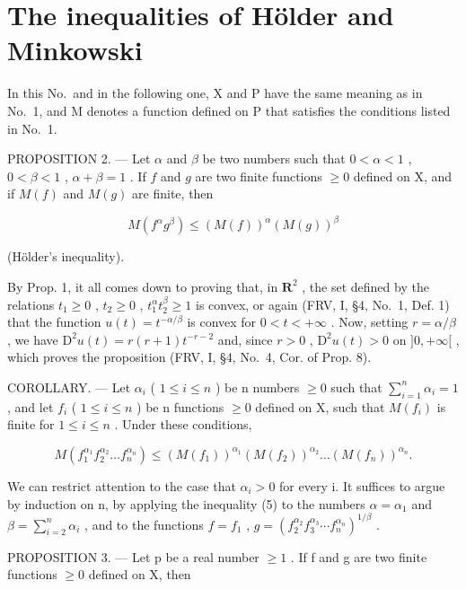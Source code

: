 \section{The inequalities of Hölder and Minkowski}

In this No.~and in the following one, X and P have the same meaning as in No.~1, and M denotes a function defined on P that satisfies the conditions listed in No.~1.

PROPOSITION 2. --- Let \(\alpha\) and \(\beta\) be two numbers such that \(0 < \alpha < 1\) , \(0 < \beta < 1\) , \(\alpha + \beta = 1\) . If \(f\) and \(g\) are two finite functions \(\geqslant 0\) defined on X, and if \(M(f)\) and \(M(g)\) are finite, then

\[
M (f ^ {\alpha} g ^ {\beta}) \leqslant (M (f)) ^ {\alpha} (M (g)) ^ {\beta}\tag{5}
\]

(Hölder's inequality).

By Prop. 1, it all comes down to proving that, in \(\mathbf{R}^2\) , the set defined by the relations \(t_1 \geqslant 0\) , \(t_2 \geqslant 0\) , \(t_1^\alpha t_2^\beta \geqslant 1\) is convex, or again (FRV, I, §4, No.~1, Def. 1) that the function \(u(t) = t^{-\alpha/\beta}\) is convex for \(0 < t < +\infty\) . Now, setting \(r = \alpha/\beta\) , we have \(\mathrm{D}^2 u(t) = r(r + 1)t^{-r - 2}\) and, since \(r > 0\) , \(\mathrm{D}^2 u(t) > 0\) on \(]0, +\infty[\) , which proves the proposition (FRV, I, §4, No.~4, Cor. of Prop. 8).

COROLLARY. --- Let \(\alpha_{i}\) ( \(1 \leqslant i \leqslant n\) ) be n numbers \(\geqslant 0\) such that \(\sum_{i=1}^{n} \alpha_{i} = 1\) , and let \(f_{i}\) ( \(1 \leqslant i \leqslant n\) ) be n functions \(\geqslant 0\) defined on X, such that \(M(f_{i})\) is finite for \(1 \leqslant i \leqslant n\) . Under these conditions,

\[
M \left(f _ {1} ^ {\alpha_ {1}} f _ {2} ^ {\alpha_ {2}} \dots f _ {n} ^ {\alpha_ {n}}\right) \leqslant \left(M (f _ {1})\right) ^ {\alpha_ {1}} \left(M (f _ {2})\right) ^ {\alpha_ {2}} \dots \left(M (f _ {n})\right) ^ {\alpha_ {n}}.\tag{6}
\]

We can restrict attention to the case that \(\alpha_{i} > 0\) for every i. It suffices to argue by induction on n, by applying the inequality (5) to the numbers \(\alpha = \alpha_{1}\) and \(\beta = \sum_{i=2}^{n} \alpha_{i}\) , and to the functions \(f = f_{1}\) , \(g = (f_{2}^{\alpha_{2}} f_{3}^{\alpha_{3}} \cdots f_{n}^{\alpha_{n}})^{1/\beta}\) .

PROPOSITION 3. --- Let p be a real number \(\geqslant 1\) . If f and g are two finite functions \(\geqslant 0\) defined on X, then

